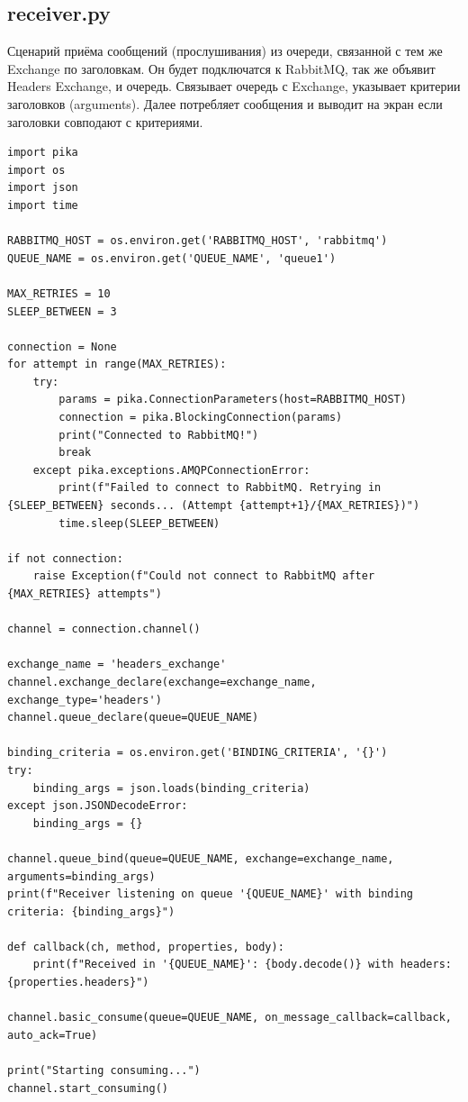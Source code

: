 \documentclass[areasetadvanced]{scrartcl}
\begin{document}
\subsection{receiver.py}
Сценарий приёма сообщений (прослушивания) из очереди, связанной с тем же Exchange по заголовкам.
Он будет подключатся к RabbitMQ, так же объявит Headers Exchange, и очередь. Связывает очередь с Exchange, указывает критерии заголовков (arguments). Далее потребляет сообщения и выводит на экран если заголовки совподают с критериями.
\begin{lstlisting}
import pika
import os
import json
import time

RABBITMQ_HOST = os.environ.get('RABBITMQ_HOST', 'rabbitmq')
QUEUE_NAME = os.environ.get('QUEUE_NAME', 'queue1')

MAX_RETRIES = 10
SLEEP_BETWEEN = 3

connection = None
for attempt in range(MAX_RETRIES):
    try:
        params = pika.ConnectionParameters(host=RABBITMQ_HOST)
        connection = pika.BlockingConnection(params)
        print("Connected to RabbitMQ!")
        break
    except pika.exceptions.AMQPConnectionError:
        print(f"Failed to connect to RabbitMQ. Retrying in {SLEEP_BETWEEN} seconds... (Attempt {attempt+1}/{MAX_RETRIES})")
        time.sleep(SLEEP_BETWEEN)

if not connection:
    raise Exception(f"Could not connect to RabbitMQ after {MAX_RETRIES} attempts")

channel = connection.channel()

exchange_name = 'headers_exchange'
channel.exchange_declare(exchange=exchange_name, exchange_type='headers')
channel.queue_declare(queue=QUEUE_NAME)

binding_criteria = os.environ.get('BINDING_CRITERIA', '{}')
try:
    binding_args = json.loads(binding_criteria)
except json.JSONDecodeError:
    binding_args = {}
    
channel.queue_bind(queue=QUEUE_NAME, exchange=exchange_name, arguments=binding_args)
print(f"Receiver listening on queue '{QUEUE_NAME}' with binding criteria: {binding_args}")

def callback(ch, method, properties, body):
    print(f"Received in '{QUEUE_NAME}': {body.decode()} with headers: {properties.headers}")

channel.basic_consume(queue=QUEUE_NAME, on_message_callback=callback, auto_ack=True)

print("Starting consuming...")
channel.start_consuming()

\end{lstlisting}
\end{document}
